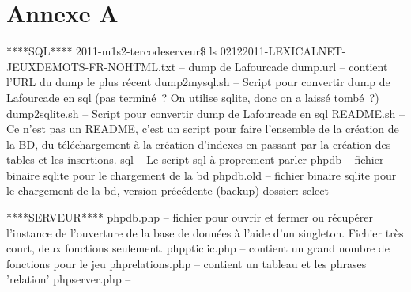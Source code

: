 \documentclass[a4paper,11pt,french]{article}
\begin{document}





\section{Annexe A}


****SQL****
2011-m1s2-ter\/code\/serveur\$ ls
02122011-LEXICALNET-JEUXDEMOTS-FR-NOHTML.txt  -- dump de Lafourcade
dump.url -- contient l'URL du dump le plus récent
dump2mysql.sh -- Script pour convertir dump de Lafourcade en sql (pas terminé~? On utilise sqlite, donc on a laissé tombé~?)
dump2sqlite.sh  -- Script pour convertir dump de Lafourcade en sql
README.sh -- Ce n'est pas un README, c'est un script pour faire l'ensemble de la création de la BD, du téléchargement à la création d'indexes en passant par la création des tables et les insertions.
sql -- Le script sql à proprement parler
php\/db -- fichier binaire sqlite pour le chargement de la bd
php\/db.old -- fichier binaire sqlite pour le chargement de la bd, version précédente (backup)
dossier: select

****SERVEUR****
php\/db.php -- fichier pour ouvrir et fermer ou récupérer l'instance de l'ouverture de la base de données à l'aide d'un singleton. 
		Fichier très court, deux fonctions seulement.
php\/pticlic.php -- contient un grand nombre de fonctions pour le jeu
php\/relations.php -- contient un tableau et les phrases 'relation'
php\/server.php --
\end{document}
